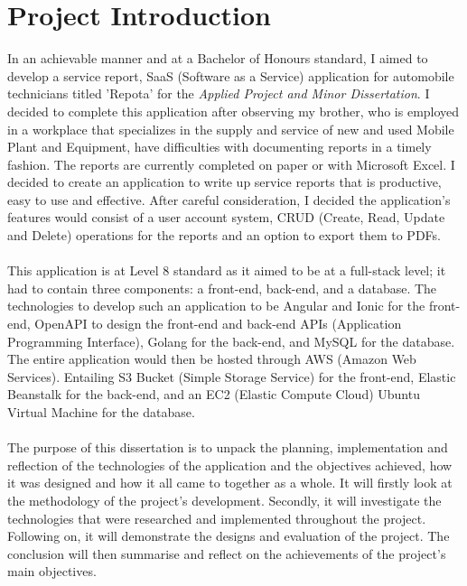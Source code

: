 \section{Project Introduction}
In an achievable manner and at a Bachelor of Honours standard, I aimed to develop a service report, SaaS (Software as a Service) application for automobile technicians titled 'Repota' for the \textit{Applied Project and Minor Dissertation}. I decided to complete this application after observing my brother, who is employed in a workplace that specializes in the supply and service of new and used Mobile Plant and Equipment, have difficulties with documenting reports in a timely fashion. The reports are currently completed on paper or with Microsoft Excel. I decided to create an application to write up service reports that is productive, easy to use and effective. After careful consideration, I decided the application's features would consist of a user account system, CRUD (Create, Read, Update and Delete) operations for the reports and an option to export them to PDFs.
\\\\ This application is at Level 8 standard as it aimed to be at a full-stack level; it had to contain three components: a front-end, back-end, and a database. The technologies to develop such an application to be Angular and Ionic for the front-end, OpenAPI to design the front-end and back-end APIs (Application Programming Interface), Golang for the back-end, and MySQL for the database. The entire application would then be hosted through AWS (Amazon Web Services). Entailing S3 Bucket (Simple Storage Service) for the front-end, Elastic Beanstalk for the back-end, and an EC2 (Elastic Compute Cloud) Ubuntu Virtual Machine for the database.
\\\\ The purpose of this dissertation is to unpack the planning, implementation and reflection of the technologies of the application and the objectives achieved, how it was designed and how it all came to together as a whole. It will firstly look at the methodology of the project's development. Secondly, it will investigate the technologies that were researched and implemented throughout the project. Following on, it will demonstrate the designs and evaluation of the project. The conclusion will then summarise and reflect on the achievements of the project's main objectives.

